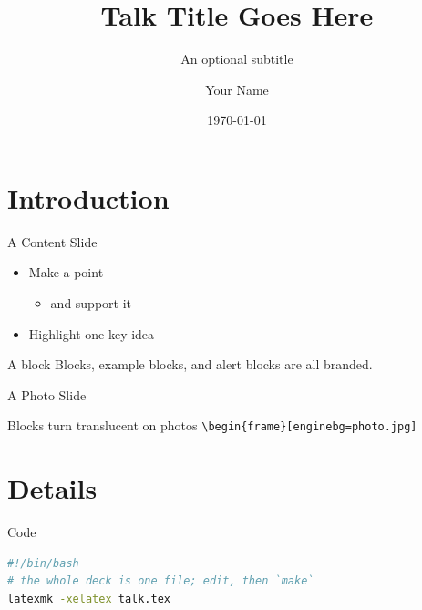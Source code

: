 \documentclass[aspectratio=169]{beamer}
\title{Talk Title Goes Here}
\subtitle{An optional subtitle}
\author{Your Name}
\institute{Your Title, Your Lab, Your Institution}
\date{\today}
\begin{document}
\begin{frame}
  \titlepage
\end{frame}

\section{Introduction}

\begin{frame}{A Content Slide}
  \begin{itemize}
  \item Make a point
    \begin{itemize}
    \item and support it
    \end{itemize}
  \item Highlight \alert{one key idea}
  \end{itemize}
  \begin{block}{A block}
    Blocks, example blocks, and alert blocks are all branded.
  \end{block}
\end{frame}

\begin{frame}[enginebg=images/wallpaper/mesa_lab.jpg]{A Photo Slide}
  \vfill
  \begin{block}{Blocks turn translucent on photos}
    \texttt{\textbackslash begin\{frame\}[enginebg=photo.jpg]}
  \end{block}
\end{frame}

\section{Details}

\begin{frame}[fragile]{Code}
\begin{lstlisting}[language=bash]
#!/bin/bash
# the whole deck is one file; edit, then `make`
latexmk -xelatex talk.tex
\end{lstlisting}
\end{frame}

\end{document}
